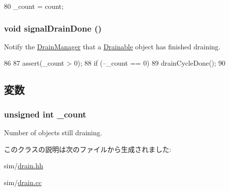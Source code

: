 \begin{DoxyCode}
80 { _count = count; }
\end{DoxyCode}
\hypertarget{classDrainManager_ab89d10e368d2e82061eddb9e40022382}{
\subsubsection[{signalDrainDone}]{\setlength{\rightskip}{0pt plus 5cm}void signalDrainDone ()}}
\label{classDrainManager_ab89d10e368d2e82061eddb9e40022382}
Notify the \hyperlink{classDrainManager}{DrainManager} that a \hyperlink{classDrainable}{Drainable} object has finished draining. 


\begin{DoxyCode}
86                            {
87         assert(_count > 0);
88         if (--_count == 0)
89             drainCycleDone();
90     }
\end{DoxyCode}


\subsection{変数}
\hypertarget{classDrainManager_a9f6ec1ea6f54a85f7a9130fb4f468a23}{
\subsubsection[{\_\-count}]{\setlength{\rightskip}{0pt plus 5cm}unsigned int {\bf \_\-count}}}
\label{classDrainManager_a9f6ec1ea6f54a85f7a9130fb4f468a23}
Number of objects still draining. 

このクラスの説明は次のファイルから生成されました:\begin{DoxyCompactItemize}
\item 
sim/\hyperlink{drain_8hh}{drain.hh}\item 
sim/\hyperlink{drain_8cc}{drain.cc}\end{DoxyCompactItemize}
